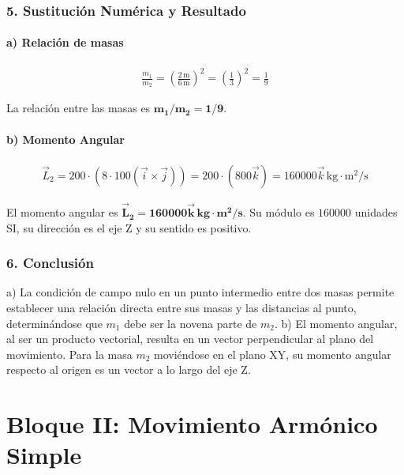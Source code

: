 \subsubsection*{5. Sustitución Numérica y Resultado}
\paragraph{a) Relación de masas}
\begin{gather}
    \frac{m_1}{m_2} = \left(\frac{2\,\text{m}}{6\,\text{m}}\right)^2 = \left(\frac{1}{3}\right)^2 = \frac{1}{9}
\end{gather}
\begin{cajaresultado}
La relación entre las masas es $\boldsymbol{m_1/m_2 = 1/9}$.
\end{cajaresultado}

\paragraph{b) Momento Angular}
\begin{gather}
    \vec{L}_2 = 200 \cdot (8 \cdot 100 (\vec{i} \times \vec{j})) = 200 \cdot (800 \vec{k}) = 160000 \vec{k} \, \text{kg}\cdot\text{m}^2/\text{s}
\end{gather}
\begin{cajaresultado}
El momento angular es $\boldsymbol{\vec{L}_2 = 160000\vec{k} \, \textbf{kg}\cdot\textbf{m}^2/\textbf{s}}$. Su módulo es $160000$ unidades SI, su dirección es el eje Z y su sentido es positivo.
\end{cajaresultado}

\subsubsection*{6. Conclusión}
\begin{cajaconclusion}
a) La condición de campo nulo en un punto intermedio entre dos masas permite establecer una relación directa entre sus masas y las distancias al punto, determinándose que $m_1$ debe ser la novena parte de $m_2$.
b) El momento angular, al ser un producto vectorial, resulta en un vector perpendicular al plano del movimiento. Para la masa $m_2$ moviéndose en el plano XY, su momento angular respecto al origen es un vector a lo largo del eje Z.
\end{cajaconclusion}

\newpage

\section{Bloque II: Movimiento Armónico Simple}
\label{sec:mas_2010_jun_ord}

